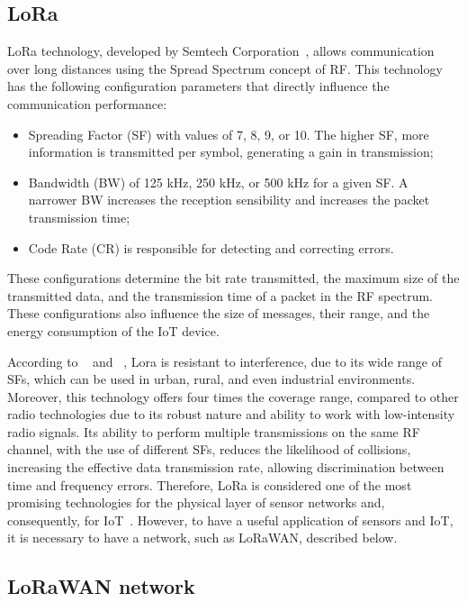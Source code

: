 \subsection{LoRa}

LoRa technology, developed by Semtech Corporation~\cite{semtech}, allows communication over long distances using the Spread Spectrum concept of RF. This technology has the following configuration parameters that directly influence the communication performance:

\begin{itemize}
\item Spreading Factor (SF) with values of 7, 8, 9, or 10. The higher SF, more information is transmitted per symbol, generating a gain in transmission;
\item Bandwidth (BW) of 125 kHz, 250 kHz, or 500 kHz for a given SF. A narrower BW increases the reception sensibility and increases the packet transmission time;
\item Code Rate (CR) is responsible for detecting and correcting errors.
\end{itemize}

These configurations determine the bit rate transmitted, the maximum size of the transmitted data, and the transmission time of a packet in the RF spectrum. These configurations also influence the size of messages, their range, and the energy consumption of the IoT device.

According to ~\cite{shanmuga2020} and ~\cite{Lee2017}, Lora is resistant to interference, due to its wide range of SFs, which can be used in urban, rural, and even industrial environments. Moreover, this technology offers four times the coverage range, compared to other radio technologies due to its robust nature and ability to work with low-intensity radio signals. Its ability to perform multiple transmissions on the same RF channel, with the use of different SFs, reduces the likelihood of collisions, increasing the effective data transmission rate, allowing discrimination between time and frequency errors. Therefore, LoRa is considered one of the most promising technologies for the physical layer of sensor networks and, consequently, for IoT~\cite{Haxhibeqiri2018}. However, to have a useful application of sensors and IoT, it is necessary to have a network, such as LoRaWAN, described below.


\subsection{LoRaWAN network}

